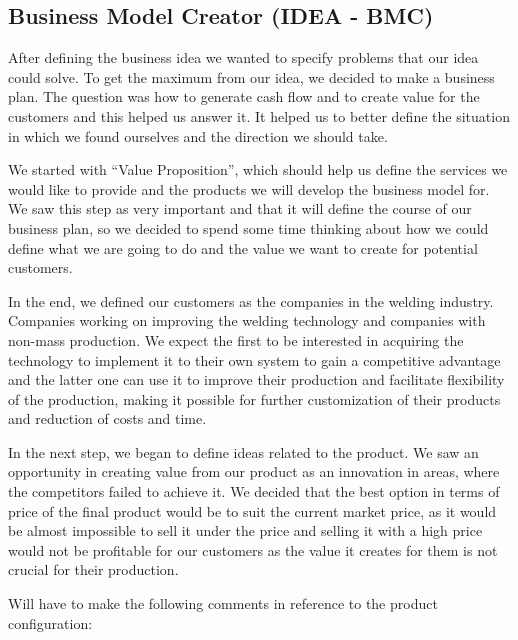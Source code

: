 \subsection{Business Model Creator (IDEA - BMC)}
\begin{figure}

\end{figure}

After defining the business idea we wanted to specify problems that our idea could solve. 
To get the maximum from our idea, we decided to make a business plan. 
The question was how to generate cash flow and to create value for the customers and this helped us answer it. 
It helped us to better define the situation in which we found ourselves and the direction we should take.

We started with “Value Proposition”, which should help us define the services we would like to provide and the products we will develop the business model for. 
We saw this step as very important and that it will define the course of our business plan, so we decided to spend some time thinking about how we could define what we are going to do and the value we want to create for potential customers.

In the end, we defined our customers as the companies in the welding industry. 
Companies working on improving the welding technology and companies with non-mass production. 
We expect the first to be interested in acquiring the technology to implement it to their own system to gain a competitive advantage and the latter one can use it to improve their production and facilitate flexibility of the production, making it possible for further customization of their products and reduction of costs and time.

In the next step, we began to define ideas related to the product.
We saw an opportunity in creating value from our product as an innovation in areas, where the competitors failed to achieve it. 
We decided that the best option in terms of price of the final product would be  to suit the current market price, as it would be almost impossible to sell it under the price and selling it with a high price would not be profitable for our customers as the value it creates for them is not crucial for their production.

Will have to make the following comments in reference to the product configuration:

